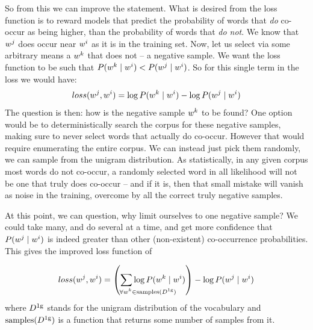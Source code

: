 \documentclass[parskip]{komatufte}
\begin{document}
So from this we can improve the statement.
What is desired from the loss function is to reward models that predict  the probability of words that \emph{do} co-occur as being higher, than the probability of words that \emph{do not}.
We know that $\n w_j$ does occur near $\n w_i$ as it is in the training set.
Now, let us select via some arbitrary means a $\n w_k$ that does not -- a negative sample.
We want the loss function to be such that $P(\n w_k\mid \n w_i) < P(\n w_j\mid \n w_i)$.
So for this single term in the loss we would have:
\begin{equation}
loss(\n w_j,\n w_i) =  \log P(\n w_k\mid \n w_i) - \log P(\n w_j\mid \n w_i)
\end{equation}
%
%
%
The question is then: how is the negative sample $\n w_k$ to be found?
One option would be to deterministically search the corpus for these negative samples, making sure to never select words that actually do co-occur.
However that would require enumerating the entire corpus.
We can instead just pick them randomly, we can sample from the unigram distribution.
As statistically, in any given corpus most words do not co-occur, 
a randomly selected word in all likelihood will not be one that truly does co-occur
-- and if it is, then that small mistake will vanish as noise in the training,
overcome by all the correct truly negative samples.


At this point, we can question, why limit ourselves to one negative sample?
We could take many, and do several at a time,
and get more confidence that $P(\n w_j\mid \n w_i)$ is indeed greater than other (non-existent) co-occurrence probabilities.
This gives the improved loss function of 

\begin{equation}
loss(\n w_j,\n w_i) = 
\left(\sum_{\mathrlap{\!\!\!\!\!\!\forall \n w_k \in \mathrm{samples}(\d D_{1g})}}
\log P(\n w_k\mid \n w_i) \right)
- \log P(\n w_j\mid \n w_i)
\label{equ:samplesloss}
\end{equation}
where $\d D_{1g}$ stands for the unigram distribution of the vocabulary
and $\mathrm{samples}(\d D_{1g})$ is a function that returns some number of samples from it.
\end{document}
